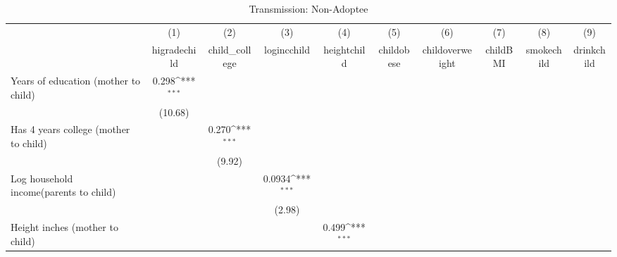 \begin{table}[htbp]\centering
\def\sym#1{\ifmmode^{#1}\else\(^{#1}\)\fi}
\caption{Transmission: Non-Adoptee}
\begin{tabular}{l*{9}{c}}
\hline\hline
            &\multicolumn{1}{c}{(1)}&\multicolumn{1}{c}{(2)}&\multicolumn{1}{c}{(3)}&\multicolumn{1}{c}{(4)}&\multicolumn{1}{c}{(5)}&\multicolumn{1}{c}{(6)}&\multicolumn{1}{c}{(7)}&\multicolumn{1}{c}{(8)}&\multicolumn{1}{c}{(9)}\\
            &\multicolumn{1}{c}{higradechild}&\multicolumn{1}{c}{child\_college}&\multicolumn{1}{c}{logincchild}&\multicolumn{1}{c}{heightchild}&\multicolumn{1}{c}{childobese}&\multicolumn{1}{c}{childoverweight}&\multicolumn{1}{c}{childBMI}&\multicolumn{1}{c}{smokechild}&\multicolumn{1}{c}{drinkchild}\\
\hline
Years of education (mother to child)&       0.298\sym{***}&                     &                     &                     &                     &                     &                     &                     &                     \\
            &     (10.68)         &                     &                     &                     &                     &                     &                     &                     &                     \\
Has 4 years college (mother to child)&                     &       0.270\sym{***}&                     &                     &                     &                     &                     &                     &                     \\
            &                     &      (9.92)         &                     &                     &                     &                     &                     &                     &                     \\
Log household income(parents to child)&                     &                     &      0.0934\sym{***}&                     &                     &                     &                     &                     &                     \\
            &                     &                     &      (2.98)         &                     &                     &                     &                     &                     &                     \\
Height inches (mother to child)&                     &                     &                     &       0.499\sym{***}&                     &                     &                     &                     &                     \\

\end{tabular}
\end{table}
